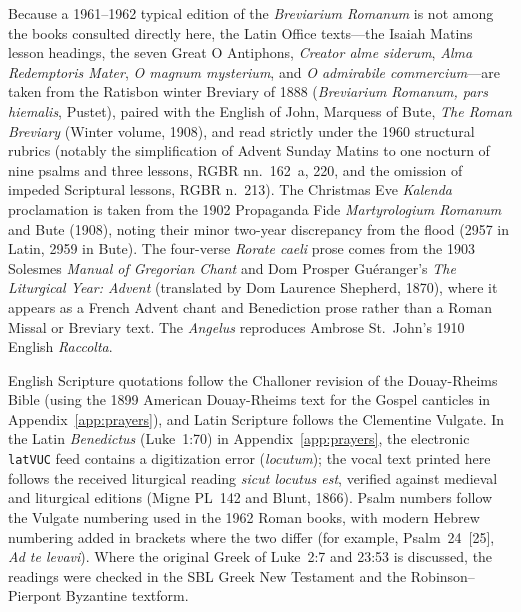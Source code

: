 Because a 1961--1962 typical edition of the \textit{Breviarium Romanum} is not
among the books consulted directly here, the Latin Office texts---the Isaiah
Matins lesson headings, the seven Great O Antiphons, \textit{Creator alme
siderum}, \textit{Alma Redemptoris Mater}, \textit{O magnum mysterium}, and
\textit{O admirabile commercium}---are taken from the Ratisbon winter Breviary
of 1888 (\textit{Breviarium Romanum, pars hiemalis}, Pustet), paired with the
English of John, Marquess of Bute, \textit{The Roman Breviary} (Winter volume,
1908), and read strictly under the 1960 structural rubrics (notably the
simplification of Advent Sunday Matins to one nocturn of nine psalms and three
lessons, RGBR nn.~162~a, 220, and the omission of impeded Scriptural lessons,
RGBR n.~213). The Christmas Eve \textit{Kalenda} proclamation is taken from the
1902 Propaganda Fide \textit{Martyrologium Romanum} and Bute (1908), noting
their minor two-year discrepancy from the flood (2957 in Latin, 2959 in Bute).
The four-verse \textit{Rorate caeli} prose comes from the 1903 Solesmes
\textit{Manual of Gregorian Chant} and Dom Prosper Gu\'eranger's \textit{The
Liturgical Year: Advent} (translated by Dom Laurence Shepherd, 1870), where it
appears as a French Advent chant and Benediction prose rather than a Roman
Missal or Breviary text. The \textit{Angelus} reproduces Ambrose St.~John's
1910 English \textit{Raccolta}.

English Scripture quotations follow the Challoner revision of the Douay-Rheims
Bible (using the 1899 American Douay-Rheims text for the Gospel canticles in
Appendix~\ref{app:prayers}), and Latin Scripture follows the Clementine
Vulgate. In the Latin \textit{Benedictus} (Luke~1:70) in
Appendix~\ref{app:prayers}, the electronic \texttt{latVUC} feed contains a
digitization error (\textit{locutum}); the vocal text printed here follows the
received liturgical reading \textit{sicut locutus est}, verified against
medieval and liturgical editions (Migne PL~142 and Blunt, 1866). Psalm numbers
follow the Vulgate numbering used in the 1962 Roman books, with modern Hebrew
numbering added in brackets where the two differ (for example,
Psalm~24~[25], \textit{Ad te levavi}). Where the original Greek of Luke~2:7 and
23:53 is discussed, the readings were checked in the SBL Greek New Testament and
the Robinson--Pierpont Byzantine textform.

